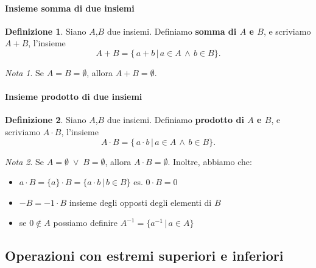 \documentclass{article}
\theoremstyle{plain}
\theoremstyle{definition}
\newtheorem{defn}{Definizione}[section]
\theoremstyle{remark}
\newtheorem{note}{Nota}
\begin{document}
\paragraph{Insieme somma di due insiemi}
\begin{bxthm}
\begin{defn}
    Siano $A$,$B$ due insiemi. Definiamo \textbf{somma di $A$ e $B$}, e scriviamo $A+B$, l'insieme 
    \[A+B=\{\,a+b\,|\,a\in A\,\land \,b\in B\}.\]
\end{defn}
\end{bxthm}

\vspace{10pt}

\begin{note}
    Se $A=B=\emptyset$, allora $A+B=\emptyset$.
\end{note}

\vspace{10pt}

\paragraph{Insieme prodotto di due insiemi}
\begin{bxthm}
\begin{defn}
    Siano $A$,$B$ due insiemi. Definiamo \textbf{prodotto di $A$ e $B$}, e scriviamo $A\cdot B$, l'insieme 
    \[A\cdot B=\{\,a\cdot b\,|\,a\in A\,\land \,b\in B\}.\]
\end{defn}
\end{bxthm}

\vspace{10pt}

\begin{note}
    Se $A=\emptyset\;\lor\; B=\emptyset$, allora $A\cdot B=\emptyset$.
    Inoltre, abbiamo che:
    \begin{itemize}
        \item $a\cdot B=\{a\}\cdot B = \{a\cdot b\,|\, b\in B\}$ es. $0\cdot B={0}$
        \item $-B=-1\cdot B$ insieme degli opposti degli elementi di $B$
        \item se $0\notin A$ possiamo definire $A^{-1}=\{a^{-1}\,|\,a\in A\}$
    \end{itemize}
\end{note}

\vspace{10pt}

\subsection{Operazioni con estremi superiori e inferiori}
\end{document}
